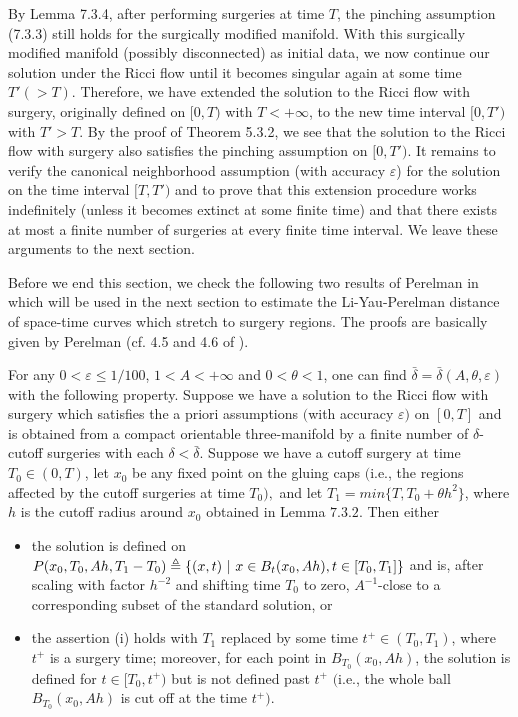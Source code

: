 \medskip
 By Lemma 7.3.4, after performing
surgeries at time $T$, the pinching assumption (7.3.3) still holds
for the surgically modified manifold. With this surgically
modified manifold (possibly disconnected) as initial data, we now
continue our solution under the Ricci flow until it becomes
singular again at some time $T'(>T)$. Therefore, we have extended
the solution to the Ricci flow with surgery, originally defined on
$[0,T)$ with $T<+\infty$, to the new time interval $[0,T')$ with
$T'>T$. By the proof of Theorem 5.3.2, we see that the solution to
the Ricci flow with surgery also satisfies the pinching assumption
on $[0,T')$. It remains to verify the canonical neighborhood
assumption (with accuracy $\varepsilon$) for the solution on the
time interval $[T,T')$ and to prove that this extension procedure
works indefinitely (unless it becomes extinct at some finite time)
and that there exists at most a finite number of surgeries at
every finite time interval. We leave these arguments to the next
section.

Before we end this section, we check the following two results of
Perelman in \cite{P2} which will be used in the next section to
estimate the Li-Yau-Perelman distance of space-time curves which
stretch to surgery regions. The proofs are basically given by
Perelman (cf. 4.5 and 4.6 of \cite{P2}).

\begin{lemma}
  \label{lem:cz-surgery-stability-near-standard-cap}

For any $0<\varepsilon \leq 1/100$, $1<A<+\infty$ and
$0<\theta<1$, one can find
$\bar{\delta}=\bar{\delta}(A,\theta,\varepsilon)$ with the
following property. Suppose we have a solution to the Ricci flow
with surgery which satisfies the a priori assumptions $($with
accuracy $\varepsilon)$ on $[0,T]$ and is obtained from a compact
orientable three-manifold by a finite number of $\delta$-cutoff
surgeries with each $\delta<\bar{\delta}$. Suppose we have a
cutoff surgery at time $T_0\in(0,T)$, let $x_0$ be any fixed point
on the gluing caps $($i.e., the regions affected by the cutoff
surgeries at time $T_0),$ and let $T_1=min\{T,T_0+\theta h^2\}$,
where $h$ is the cutoff radius around $x_0$ obtained in Lemma
$7.3.2.$ Then either
\begin{itemize}
\item[(i)] the solution is defined on
$P(x_0,T_0,Ah,T_1-T_0)\triangleq\{(x,t)\ |\ x\in B_t(x_0,Ah),\\
 t\in[T_0,T_1]\}$ and is, after scaling with factor $h^{-2}$ and
shifting time $T_0$ to zero, $A^{-1}$-close to a corresponding
subset of the standard solution, or \item[(ii)] the assertion (i)
holds with $T_1$ replaced by some time $t^+\in(T_0,T_1)$, where
$t^+$ is a surgery time; moreover, for each point in
$B_{T_0}(x_0,Ah)$, the solution is defined for $t\in[T_0,t^+)$ but
is not defined past $t^+$ $($i.e., the whole ball
$B_{T_0}(x_0,Ah)$ is cut off at the time $t^+).$
\end{itemize}
\end{lemma}

